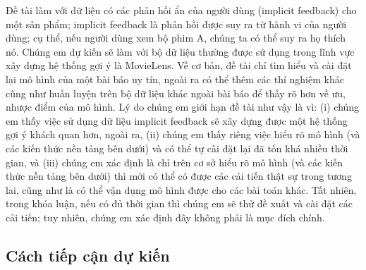 \documentclass{article}[14pt]
\begin{document}
{    %
    Đề tài làm với dữ liệu có các phản hồi ẩn của người dùng (implicit feedback) 
    cho một sản phẩm; implicit feedback là phản hồi được suy ra từ hành vi của người dùng; 
    cụ thể, nếu người dùng xem bộ phim A, chúng ta có thể suy ra họ thích nó. 
    Chúng em dự kiến sẽ làm với bộ dữ liệu thường được sử 
    dụng trong lĩnh vực xây dựng  hệ thống gợi ý là MovieLens.
    Về cơ bản, đề tài chỉ tìm hiểu và cài đặt lại mô hình của một bài báo uy 
tín, ngoài ra có thể thêm các thí nghiệm khác cũng như huấn luyện trên 
bộ dữ liệu khác ngoài bài báo để thấy rõ hơn về ưu, nhược điểm của mô 
hình.
    Lý do chúng em giới hạn đề tài như vậy là vì: (i) chúng em thấy việc sử dụng 
    dữ liệu implicit feedback sẽ xây dựng được một hệ thống gợi ý khách quan hơn, 
     ngoài ra, (ii) chúng em thấy riêng 
việc hiểu rõ mô hình (và các kiến thức nền tảng bên dưới) và có thể tự 
cài đặt lại đã tốn khá nhiều thời gian, và (iii) chúng em xác định là chỉ 
trên cơ sở hiểu rõ mô hình (và các kiến thức nền tảng bên dưới) thì mới 
có thể có được các cải tiến thật sự trong tương lai, cũng như là có thể 
vận dụng mô hình được cho các bài toán khác.
    Tất nhiên, trong khóa luận, nếu có đủ thời gian thì chúng em sẽ thử đề 
xuất và cài đặt các cải tiến; tuy nhiên, chúng em xác định đây không 
phải là mục đích chính.
    
    \subsection{Cách tiếp cận dự kiến}
    

}
\end{document}
